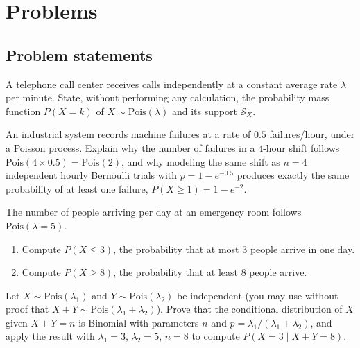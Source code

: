 \section*{Problems}

\subsection*{Problem statements}

\begin{problema}
	\label{prob:06f83cc}
	A telephone call center receives calls independently at a constant average rate $\lambda$ per minute. State, without performing any calculation, the probability mass function $P(X=k)$ of $X\sim\text{Pois}(\lambda)$ and its support $\mathcal{S}_X$.
\end{problema}

\begin{problema}
	\label{prob:c35cfa7}
	An industrial system records machine failures at a rate of $0.5$ failures/hour, under a Poisson process. Explain why the number of failures in a $4$-hour shift follows $\text{Pois}(4\times0.5)=\text{Pois}(2)$, and why modeling the same shift as $n=4$ independent hourly Bernoulli trials with $p=1-e^{-0.5}$ produces exactly the same probability of at least one failure, $P(X\ge1)=1-e^{-2}$.
\end{problema}

\begin{problema}
	\label{prob:8fd3390}
	The number of people arriving per day at an emergency room follows $\text{Pois}(\lambda=5)$.
	\begin{enumerate}
		\item Compute $P(X\le3)$, the probability that at most $3$ people arrive in one day.
		\item Compute $P(X\ge8)$, the probability that at least $8$ people arrive.
	\end{enumerate}
\end{problema}

\begin{problema}
	\label{prob:8dad711}
	Let $X\sim\text{Pois}(\lambda_1)$ and $Y\sim\text{Pois}(\lambda_2)$ be independent (you may use without proof that $X+Y\sim\text{Pois}(\lambda_1+\lambda_2)$). Prove that the conditional distribution of $X$ given $X+Y=n$ is Binomial with parameters $n$ and $p=\lambda_1/(\lambda_1+\lambda_2)$, and apply the result with $\lambda_1=3$, $\lambda_2=5$, $n=8$ to compute $P(X=3\mid X+Y=8)$.
\end{problema}

